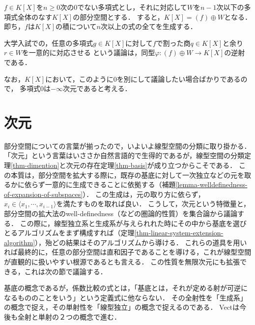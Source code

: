 \documentclass[uplatex, dvipdfmx]{jsreport}
\begin{document}
\begin{example}
    $f\in K[X]$を$n\ge 0$次の$0$でない多項式とし，それに対応して$W$を$n-1$次以下の多項式全体のなす$K[X]$の部分空間とする．
    すると，$K[X]=(f)\oplus W$となる．即ち，$f$は$K[X]$の積について$n$次以上の式の全てを生成する．

    大学入試での，任意の多項式$g\in K[X]$に対して$f$で割った商$q\in K[X]$と余り$r\in W$を一意的に対応させる
    という議論は，同型$\varphi:(f)\oplus W\to K[X]$の逆射である．
    
    なお，$K[X]$において，このように$0$を別にして議論したい場合ばかりであるので，
    多項式$0$は$-\infty$次元であると考える．
\end{example}

\section{次元}

\begin{tcolorbox}[colframe=ForestGreen, colback=ForestGreen!10!white, breakable]
    部分空間についての言葉が揃ったので，いよいよ線型空間の分類に取り掛かる．
    「次元」という言葉はいささか自然言語的で生得的であるが，線型空間の分類定理\ref{thm-dimention}と次元の存在定理\ref{thm-basis}が成り立つからこそである．
    この本質は，部分空間を拡大する際に，既存の基底に対して一次独立などの元を取るかに依らず一意的に生成できることに依拠する（補題\ref{lemma-welldefinedness-of-expansion-of-subspaces}）．
    この生成は，元の取り方に依らず，$x_i\in\langle x_1,\cdots,x_{i-1}\rangle$を満たすものを取れば良い．
    こうして，次元という特徴量と，部分空間の拡大法のwell-definedness（などの圏論的性質）を集合論から議論する．
    この際に，線型独立系と生成系が与えられれた時にその中から基底を選びとるアルゴリズムをまず構成すれば（定理\ref{thm-linear-system-extension-algorithm}），殆どの結果はそのアルゴリズムから導ける．
    これらの道具を用いれば最終的に，任意の部分空間は直和因子であることを導ける，これが線型空間が直観的に扱いやすい根源であるとも言える．
    この性質を無限次元にも拡張できる，これは次の節で議論する．

    基底の概念であるが，係数比較の式とは，「基底とは，それが定める射が可逆になるもののことをいう」という定義式に他ならない．
    その全射性を「生成系」の概念で捉え，その単射性を「線型独立」の概念で捉えるのである．
    Vectは今後も全射と単射の２つの概念で進む．
\end{tcolorbox}
\end{document}
